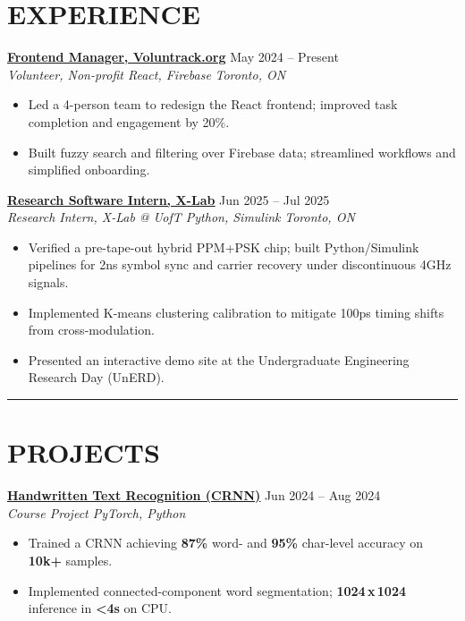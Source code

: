 \documentclass[letterpaper,10pt]{article}
\begin{document}
\section*{\textbf{EXPERIENCE}}
\noindent\href{https://volun-track.web.app}{\uline{\textbf{Frontend Manager, Voluntrack.org}}} \hfill May 2024 -- Present\\
\textit{Volunteer, Non-profit \textbar{} React, Firebase} \hfill \textit{Toronto, ON}
\begin{itemize}
    \item Led a 4-person team to redesign the React frontend; improved task completion and engagement by 20\%.
    \item Built fuzzy search and filtering over Firebase data; streamlined workflows and simplified onboarding.
\end{itemize}

\vspace{0.2cm}
\noindent\href{https://github.com/Ken-2511/ppm-psk-visualize}{\uline{\textbf{Research Software Intern, X-Lab}}} \hfill Jun 2025 -- Jul 2025\\
\textit{Research Intern, X-Lab @ UofT \textbar{} Python, Simulink} \hfill \textit{Toronto, ON}
\begin{itemize}
	\item Verified a pre-tape-out hybrid PPM+PSK chip; built Python/Simulink pipelines for 2ns symbol sync and carrier recovery under discontinuous 4GHz signals.
	\item Implemented K-means clustering calibration to mitigate 100ps timing shifts from cross-modulation.
	\item Presented an interactive demo site at the Undergraduate Engineering Research Day (UnERD).
\end{itemize}

\noindent\rule{\linewidth}{1pt}

\section*{\textbf{PROJECTS}}
\noindent\href{https://github.com/Ken-2511/HandwritingRecognition}{\uline{\textbf{Handwritten Text Recognition (CRNN)}}} \hfill Jun 2024 -- Aug 2024\\
\textit{Course Project \textbar{} PyTorch, Python}
\begin{itemize}
    \item Trained a CRNN achieving \textbf{87\%} word- and \textbf{95\%} char-level accuracy on \textbf{10k+} samples.
    \item Implemented connected-component word segmentation; \textbf{1024\,x\,1024} inference in \textbf{\textless 4s} on CPU.
\end{itemize}
\end{document}
